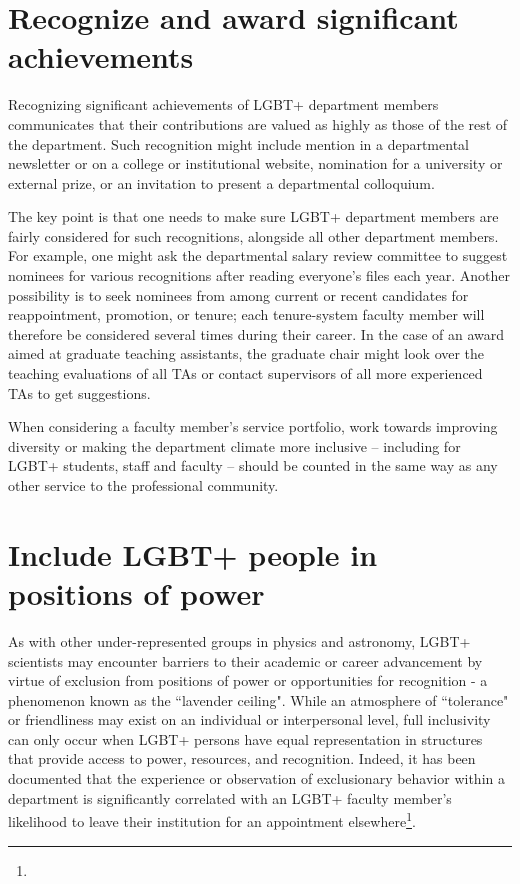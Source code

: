 \section {Recognize and award significant achievements}
\label{recognize-achievements}
Recognizing significant achievements of LGBT+ department members communicates that their contributions are valued as highly as those of the rest of the department. Such recognition might include mention in a departmental newsletter or on a college or institutional website, nomination for a university or external prize, or an invitation to present a departmental colloquium.

The key point is that one needs to make sure LGBT+ department members are fairly considered for such recognitions, alongside all other department members. For example, one might ask the departmental salary review committee to suggest nominees for various recognitions after reading everyone's files each year. Another possibility is to seek nominees from among current or recent candidates for reappointment, promotion, or tenure; each tenure-system faculty member will therefore be considered several times during their career. In the case of an award aimed at graduate teaching assistants, the graduate chair might look over the teaching evaluations of all TAs or contact supervisors of all more experienced TAs to get suggestions.

When considering a faculty member's service portfolio, work towards improving diversity or making the department climate more inclusive -- including for LGBT+ students, staff and faculty -- should be counted in the same way as any other service to the professional community.


\section {Include LGBT+ people in positions of power}
\label{positions-of-power}
As with other under-represented groups in physics and astronomy, LGBT+ scientists may encounter barriers to their academic or career advancement by virtue of exclusion from positions of power or opportunities for recognition - a phenomenon known as the ``lavender ceiling". While an atmosphere of ``tolerance" or friendliness may exist on an individual or interpersonal level, full inclusivity can only occur when LGBT+ persons have {equal representation in structures} that provide access to power, resources, and recognition. Indeed, it has been documented that the experience or observation of exclusionary behavior within a department is significantly correlated with an LGBT+ faculty member's likelihood to leave their institution for an appointment elsewhere\footnote{}.


